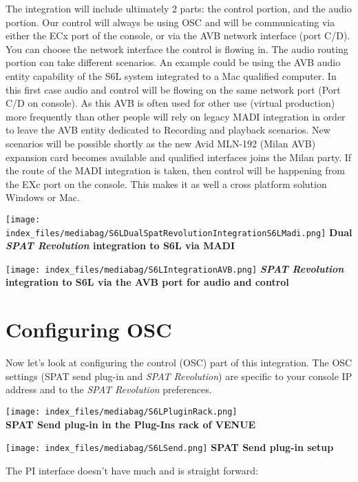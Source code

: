 \documentclass[
  letterpaper,
  DIV=11,
  numbers=noendperiod]{scrreport}
\begin{document}
The integration will include ultimately 2 parts: the control portion,
and the audio portion. Our control will always be using OSC and will be
communicating via either the ECx port of the console, or via the AVB
network interface (port C/D). You can choose the network interface the
control is flowing in. The audio routing portion can take different
scenarios. An example could be using the AVB audio entity capability of
the S6L system integrated to a Mac qualified computer. In this first
case audio and control will be flowing on the same network port (Port
C/D on console). As this AVB is often used for other use (virtual
production) more frequently than other people will rely on legacy MADI
integration in order to leave the AVB entity dedicated to Recording and
playback scenarios. New scenarios will be possible shortly as the new
Avid MLN-192 (Milan AVB) expansion card becomes available and qualified
interfaces joins the Milan party. If the route of the MADI integration
is taken, then control will be happening from the EXc port on the
console. This makes it as well a cross platform solution Windows or Mac.

\texttt{[image: index\_files/mediabag/S6LDualSpatRevolutionIntegrationS6LMadi.png]}
\textbf{Dual \emph{SPAT Revolution} integration to S6L via MADI}

\texttt{[image: index\_files/mediabag/S6LIntegrationAVB.png]}
\textbf{\emph{SPAT Revolution} integration to S6L via the AVB port for
audio and control}

\hypertarget{configuring-osc}{%
\section{Configuring OSC}\label{configuring-osc}}

Now let's look at configuring the control (OSC) part of this
integration. The OSC settings (SPAT send plug-in and \emph{SPAT
Revolution}) are specific to your console IP address and to the
\emph{SPAT Revolution} preferences.

\texttt{[image: index\_files/mediabag/S6LPluginRack.png]}\\
\textbf{SPAT Send plug-in in the Plug-Ins rack of VENUE}

\texttt{[image: index\_files/mediabag/S6LSend.png]} \textbf{SPAT Send
plug-in setup}

The PI interface doesn't have much and is straight forward:
\end{document}
